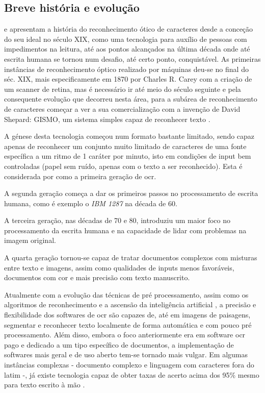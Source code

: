 \subsection{Breve história e evolução}

\cite{10.5555/1074100.1074664} e \cite{6993174} apresentam a história do reconhecimento ótico de caracteres desde a conceção do seu ideal no século XIX, como uma tecnologia para auxílio de pessoas com impedimentos na leitura, até aos pontos alcançados na última década onde até escrita humana se tornou num desafio, até certo ponto, conquistável.
As primeiras instâncias de reconhecimento óptico realizado por máquinas deu-se no final do séc. XIX, mais especificamente em 1870 por Charles R. Carey  com a criação de um scanner de retina, mas é necessário ir até meio do século seguinte e pela consequente evolução que decorreu nesta área, para a subárea de reconhecimento de caracteres começar a ver a sua comercialização com a invenção de David Shepard: GISMO, um sistema simples capaz de reconhecer texto .

A génese desta tecnologia começou num formato bastante limitado, sendo capaz apenas de reconhecer um conjunto muito limitado de caracteres de uma fonte específica a um ritmo de 1 caráter por minuto, isto em condições de input bem controladas (papel sem ruído, apenas com o texto a ser reconhecido). Esta é considerada por \cite{6993174} como a primeira geração de \acrshort{ocr}.

A segunda geração começa a dar os primeiros passos no processamento de escrita humana, como é exemplo o \textit{IBM 1287} na década de 60.

A terceira geração, nas décadas de 70 e 80, introduziu um maior foco no processamento da escrita humana e na capacidade de lidar com problemas na imagem original.

A quarta geração tornou-se capaz de tratar documentos complexos com misturas entre texto e imagens, assim como qualidades de inputs menos favoráveis, documentos com cor e mais precisão com texto manuscrito.

Atualmente com a evolução das técnicas de pré processamento, assim como os algoritmos de reconhecimento e a ascensão da inteligência artificial \citep{9183326}, a precisão e flexibilidade dos softwares de \acrshort{ocr} são capazes de, até em imagens de paisagens, segmentar e reconhecer texto localmente de forma automática e com pouco pré processamento. Além disso, embora o foco anteriormente era em software \acrshort{ocr} pago e dedicado a um tipo específico de documentos, a implementação de softwares mais geral e de uso aberto tem-se tornado mais vulgar.
Em algumas instâncias complexas - documento complexo e linguagem com caracteres fora do latim -, já existe tecnologia capaz de obter taxas de acerto acima dos 95\% mesmo para texto escrito à mão \citep{9183326}.   


